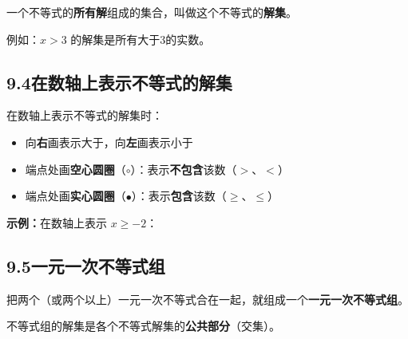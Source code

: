 \documentclass[12pt, a4paper]{ctexart}
\begin{document}
\begin{tipbox}[解集的概念]
一个不等式的\textbf{所有解}组成的集合，叫做这个不等式的\textbf{解集}。

例如：$x > 3$ 的解集是所有大于3的实数。
\end{tipbox}

\subsection*{9.4\quad 在数轴上表示不等式的解集}

\begin{knowledgebox}[9.4.1 数轴表示法]
在数轴上表示不等式的解集时：
\begin{itemize}[leftmargin=2em]
  \item 向\textbf{右}画表示大于，向\textbf{左}画表示小于
  \item 端点处画\textbf{空心圆圈}（$\circ$）：表示\textbf{不包含}该数（$>$、$<$）
  \item 端点处画\textbf{实心圆圈}（$\bullet$）：表示\textbf{包含}该数（$\geqslant$、$\leqslant$）
\end{itemize}

\textbf{示例：}在数轴上表示 $x \geqslant -2$：

\begin{center}
\end{center}
\end{knowledgebox}

\subsection*{9.5\quad 一元一次不等式组}

\begin{knowledgebox}[9.5.1 不等式组及其解集]
把两个（或两个以上）一元一次不等式合在一起，就组成一个\textbf{一元一次不等式组}。

不等式组的解集是各个不等式解集的\textbf{公共部分}（交集）。
\end{knowledgebox}
\end{document}
